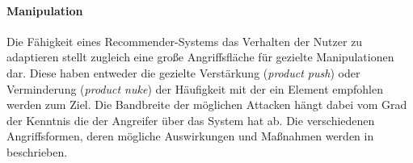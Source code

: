 \paragraph{Manipulation} Die Fähigkeit eines Recommender-Systems das Verhalten der Nutzer zu adaptieren stellt zugleich eine große Angriffsfläche für gezielte Manipulationen dar. Diese haben entweder die gezielte Verstärkung (\textit{product push}) oder Verminderung (\textit{product nuke}) der Häufigkeit mit der ein Element empfohlen werden zum Ziel. Die Bandbreite der möglichen Attacken hängt dabei vom Grad der Kenntnis die der Angreifer über das System hat ab. Die verschiedenen Angriffsformen, deren mögliche Auswirkungen und Maßnahmen werden in \citep{hb_25} beschrieben. 

